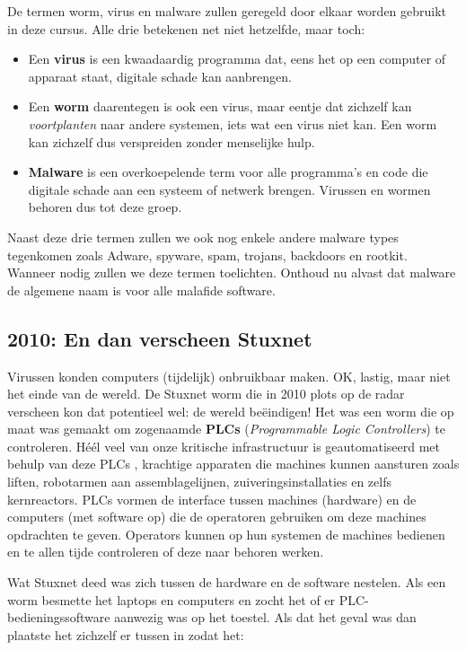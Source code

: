 \documentclass[
  10pt,
  dutch,
  paper=a4,
  ,captions=tableheading
]{scrbook}
\providecommand{\tightlist}{%
  \setlength{\itemsep}{0pt}\setlength{\parskip}{0pt}}
\begin{document}
\begin{noteblock}
De termen worm, virus en malware zullen geregeld door elkaar worden
gebruikt in deze cursus. Alle drie betekenen net niet hetzelfde, maar
toch:

\begin{itemize}
\tightlist
\item
  Een \textbf{virus} is een kwaadaardig programma dat, eens het op een
  computer of apparaat staat, digitale schade kan aanbrengen.
\item
  Een \textbf{worm} daarentegen is ook een virus, maar eentje dat
  zichzelf kan \emph{voortplanten} naar andere systemen, iets wat een
  virus niet kan. Een worm kan zichzelf dus verspreiden zonder
  menselijke hulp.
\item
  \textbf{Malware} is een overkoepelende term voor alle programma's en
  code die digitale schade aan een systeem of netwerk brengen. Virussen
  en wormen behoren dus tot deze groep.
\end{itemize}

Naast deze drie termen zullen we ook nog enkele andere malware types
tegenkomen zoals Adware, spyware, spam, trojans, backdoors en rootkit.
Wanneer nodig zullen we deze termen toelichten. Onthoud nu alvast dat
malware de algemene naam is voor alle malafide software.
\end{noteblock}

\subsection{2010: En dan verscheen
Stuxnet}\label{en-dan-verscheen-stuxnet}

Virussen konden computers (tijdelijk) onbruikbaar maken. OK, lastig,
maar niet het einde van de wereld. De Stuxnet worm die in 2010 plots op
de radar verscheen kon dat potentieel wel: de wereld beëindigen! Het was
een worm die op maat was gemaakt om zogenaamde \textbf{PLCs}
(\emph{Programmable Logic Controllers}) te controleren. Héél veel van
onze kritische infrastructuur is geautomatiseerd met behulp van deze
PLCs , krachtige apparaten die machines kunnen aansturen zoals liften,
robotarmen aan assemblagelijnen, zuiveringsinstallaties en zelfs
kernreactors. PLCs vormen de interface tussen machines (hardware) en de
computers (met software op) die de operatoren gebruiken om deze machines
opdrachten te geven. Operators kunnen op hun systemen de machines
bedienen en te allen tijde controleren of deze naar behoren werken.

Wat Stuxnet deed was zich tussen de hardware en de software nestelen.
Als een worm besmette het laptops en computers en zocht het of er
PLC-bedieningssoftware aanwezig was op het toestel. Als dat het geval
was dan plaatste het zichzelf er tussen in zodat het:
\end{document}
